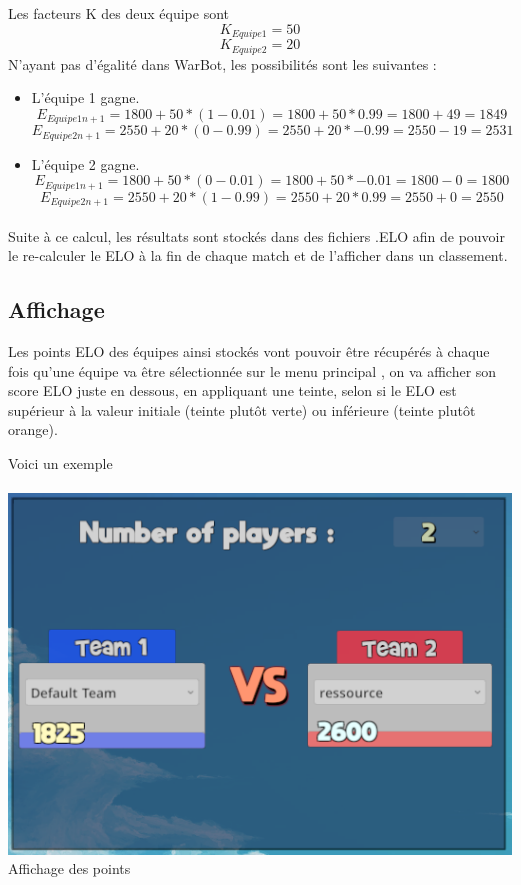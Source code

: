 \documentclass{report}
\begin{document}
Les facteurs K des deux équipe sont 
\[
K_{Equipe 1} = 50
\]
\[
K_{Equipe 2} = 20
\]\newline
N'ayant pas d'égalité dans WarBot, les possibilités sont les suivantes :
\newline
\begin{itemize}
\item
L'équipe 1 gagne.
\[
E_{Equipe 1 n+1} = 1800 + 50 * (1 - 0.01) = 1800 + 50 *  0.99 = 1800 + 49 = 1849
\]
\[
E_{Equipe 2 n+1} = 2550 + 20 * (0 - 0.99) = 2550 + 20 * -0.99 = 2550 - 19 = 2531
\]
\newline
\item
L'équipe 2 gagne.
\[
E_{Equipe 1 n+1} = 1800 + 50 * (0 - 0.01) = 1800 + 50 * -0.01 = 1800 - 0 = 1800
\]
\[
E_{Equipe 2 n+1} = 2550 + 20 * (1 - 0.99) = 2550 + 20 *  0.99 = 2550 + 0 = 2550
\]
\end{itemize}
\paragraph{}
Suite à ce calcul, les résultats sont stockés dans des fichiers .ELO afin de pouvoir le re-calculer le ELO à la fin de chaque match et de l'afficher dans un classement.

\subsection{Affichage}
Les points ELO des équipes ainsi stockés vont pouvoir être récupérés à chaque fois qu’une équipe va être sélectionnée sur le menu principal , on va afficher son score ELO juste en dessous, en appliquant une teinte, selon si le ELO est supérieur à la valeur initiale (teinte plutôt verte) ou inférieure (teinte plutôt orange).

Voici un exemple 

\paragraph{}
\begin{center}
\includegraphics[scale=0.7]{DATA/Elo.png}
 {Affichage des points}
\end{center}
\end{document}
